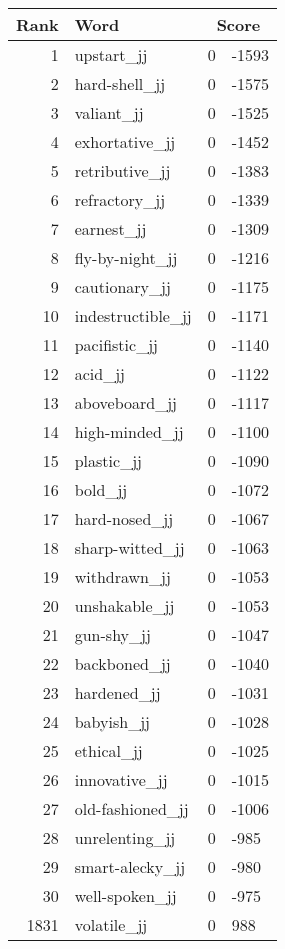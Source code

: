 \begin{longtable}[!htbp]{| rlr@{.}l |}
    \hline
    \textbf{Rank} & \textbf{Word} & \multicolumn{2}{c|}{\textbf{Score}} \\
    \hline
    \endhead
    1 & upstart\_jj & 0 & -1593 \\
    2 & hard-shell\_jj & 0 & -1575 \\
    3 & valiant\_jj & 0 & -1525 \\
    4 & exhortative\_jj & 0 & -1452 \\
    5 & retributive\_jj & 0 & -1383 \\
    6 & refractory\_jj & 0 & -1339 \\
    7 & earnest\_jj & 0 & -1309 \\
    8 & fly-by-night\_jj & 0 & -1216 \\
    9 & cautionary\_jj & 0 & -1175 \\
    10 & indestructible\_jj & 0 & -1171 \\
    11 & pacifistic\_jj & 0 & -1140 \\
    12 & acid\_jj & 0 & -1122 \\
    13 & aboveboard\_jj & 0 & -1117 \\
    14 & high-minded\_jj & 0 & -1100 \\
    15 & plastic\_jj & 0 & -1090 \\
    16 & bold\_jj & 0 & -1072 \\
    17 & hard-nosed\_jj & 0 & -1067 \\
    18 & sharp-witted\_jj & 0 & -1063 \\
    19 & withdrawn\_jj & 0 & -1053 \\
    20 & unshakable\_jj & 0 & -1053 \\
    21 & gun-shy\_jj & 0 & -1047 \\
    22 & backboned\_jj & 0 & -1040 \\
    23 & hardened\_jj & 0 & -1031 \\
    24 & babyish\_jj & 0 & -1028 \\
    25 & ethical\_jj & 0 & -1025 \\
    26 & innovative\_jj & 0 & -1015 \\
    27 & old-fashioned\_jj & 0 & -1006 \\
    28 & unrelenting\_jj & 0 & -985 \\
    29 & smart-alecky\_jj & 0 & -980 \\
    30 & well-spoken\_jj & 0 & -975 \\
    1831 & volatile\_jj & 0 & 988 \\

\end{longtable}
